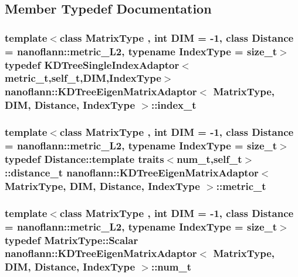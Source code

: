 \subsection{Member Typedef Documentation}
\hypertarget{structnanoflann_1_1_k_d_tree_eigen_matrix_adaptor_abe94a08556e96937c80f8e13ba668b6b}{
\subsubsection[{index\-\_\-t}]{\setlength{\rightskip}{0pt plus 5cm}template$<$class Matrix\-Type , int D\-I\-M = -\/1, class Distance  = nanoflann\-::metric\-\_\-\-L2, typename Index\-Type  = size\-\_\-t$>$ typedef {\bf K\-D\-Tree\-Single\-Index\-Adaptor}$<$ {\bf metric\-\_\-t},{\bf self\-\_\-t},D\-I\-M,Index\-Type$>$ {\bf nanoflann\-::\-K\-D\-Tree\-Eigen\-Matrix\-Adaptor}$<$ Matrix\-Type, D\-I\-M, Distance, Index\-Type $>$\-::{\bf index\-\_\-t}}}\label{structnanoflann_1_1_k_d_tree_eigen_matrix_adaptor_abe94a08556e96937c80f8e13ba668b6b}
\hypertarget{structnanoflann_1_1_k_d_tree_eigen_matrix_adaptor_a77aec885161810b958097f7725fc407e}{
\subsubsection[{metric\-\_\-t}]{\setlength{\rightskip}{0pt plus 5cm}template$<$class Matrix\-Type , int D\-I\-M = -\/1, class Distance  = nanoflann\-::metric\-\_\-\-L2, typename Index\-Type  = size\-\_\-t$>$ typedef Distance\-::template traits$<${\bf num\-\_\-t},{\bf self\-\_\-t}$>$\-::distance\-\_\-t {\bf nanoflann\-::\-K\-D\-Tree\-Eigen\-Matrix\-Adaptor}$<$ Matrix\-Type, D\-I\-M, Distance, Index\-Type $>$\-::{\bf metric\-\_\-t}}}\label{structnanoflann_1_1_k_d_tree_eigen_matrix_adaptor_a77aec885161810b958097f7725fc407e}
\hypertarget{structnanoflann_1_1_k_d_tree_eigen_matrix_adaptor_a5198c559d4134cbb14767e10d6945748}{
\subsubsection[{num\-\_\-t}]{\setlength{\rightskip}{0pt plus 5cm}template$<$class Matrix\-Type , int D\-I\-M = -\/1, class Distance  = nanoflann\-::metric\-\_\-\-L2, typename Index\-Type  = size\-\_\-t$>$ typedef Matrix\-Type\-::\-Scalar {\bf nanoflann\-::\-K\-D\-Tree\-Eigen\-Matrix\-Adaptor}$<$ Matrix\-Type, D\-I\-M, Distance, Index\-Type $>$\-::{\bf num\-\_\-t}}}\label{structnanoflann_1_1_k_d_tree_eigen_matrix_adaptor_a5198c559d4134cbb14767e10d6945748}
